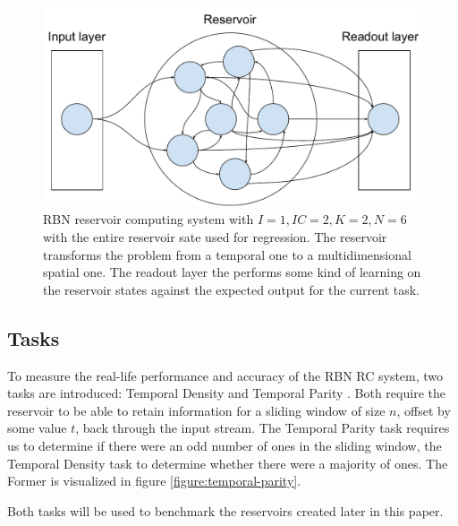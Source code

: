 \begin{figure}
  \centering
  \includegraphics[width=\columnwidth]{background/RBN-Reservoir.pdf}
    \caption[An example RBN reservoir computing system]{
    RBN reservoir computing system with $I=1, IC=2, K=2, N=6$ with the entire reservoir sate used for regression.
    The reservoir transforms the problem from a temporal one to a multidimensional spatial one.
    The readout layer the performs some kind of learning on the reservoir states against the expected output for the current task.}
  \label{figure:rbn-reservoir}
\end{figure}

\subsection{Tasks}
\label{section:tasks}

To measure the real-life performance and accuracy of the RBN RC system,
two tasks are introduced: Temporal Density and Temporal Parity \cite{rbn-reservoir}.
Both require the reservoir to be able to retain information for a sliding window of size $ n $,
offset by some value $ t $, back through the input stream.
The Temporal Parity task requires us to determine if there were an odd number of ones in the sliding window,
the Temporal Density task to determine whether there were a majority of ones.
The Former is visualized in figure \ref{figure:temporal-parity}.

Both tasks will be used to benchmark the reservoirs created later in this paper.

